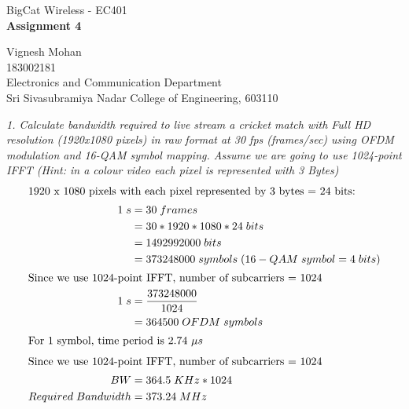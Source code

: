 \documentclass[a4paper]{article}
\begin{document}
	
	\Large
	\begin{center}
		BigCat Wireless - EC401\\
		\textbf{Assignment 4}
		
		\hspace{10pt}
		
		\large
		Vignesh Mohan\\
		\smallskip
		\small
		183002181\\
		\small
		Electronics and Communication Department\\
		\small
		Sri Sivasubramiya Nadar College of Engineering, 603110\\
	\end{center}
	
	\hspace{10pt}
	\normalsize
	
	\textit{1. Calculate bandwidth required to live stream a cricket match with Full HD resolution (1920x1080 pixels) in raw format at 30 fps (frames/sec) using OFDM modulation and 16-QAM symbol mapping. Assume we are going to use 1024-point IFFT (Hint: in a colour video each pixel is represented with 3 Bytes)}
	\begin{align*}
	\intertext{1920 x 1080 pixels with each pixel represented by 3 bytes = 24 bits: }
	1\;s & = 30 \;frames\\
	&   = 30 * 1920 * 1080 * 24\; bits\\
	&   = 1492992000\; bits\\
	&  = 373248000 \;symbols \;(16-QAM \;symbol = 4 \; bits)\\
	\intertext{Since we use 1024-point IFFT, number of subcarriers = 1024}
	1\;s & = \frac{373248000}{1024}\\
	& = 364500 \;OFDM \;symbols\\
	\shortintertext{For 1 symbol, time period is 2.74 $\mu s$}
	\intertext{Since we use 1024-point IFFT, number of subcarriers = 1024}
	BW & = 364.5 \;KHz * 1024\\
	Required\;Bandwidth & = 373.24 \; MHz\\
	\end{align*}
	
\end{document}
